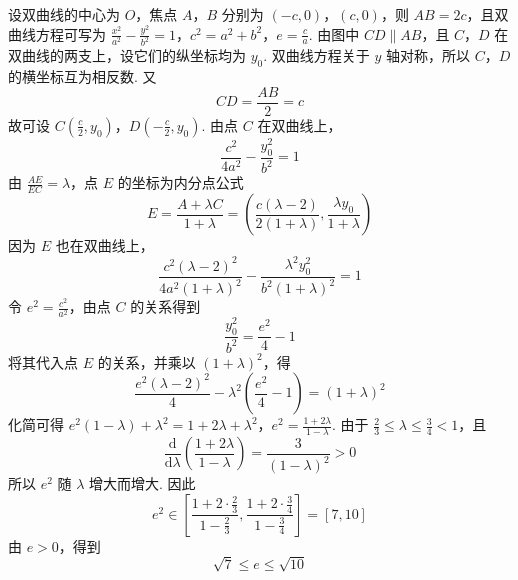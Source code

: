 \begin{solution}
设双曲线的中心为 \(O\)，焦点 \(A\)，\(B\) 分别为 \((-c,0)\)，\((c,0)\)，则 \(AB=2c\)，且双曲线方程可写为
\(\frac{x^2}{a^2}-\frac{y^2}{b^2}=1\)，\(c^2=a^2+b^2\)，\(e=\frac{c}{a}\).
由图中 \(CD\parallel AB\)，且 \(C\)，\(D\) 在双曲线的两支上，设它们的纵坐标均为 \(y_0\). 双曲线方程关于 \(y\) 轴对称，所以 \(C\)，\(D\) 的横坐标互为相反数. 又
\[
CD=\frac{AB}{2}=c
\]
故可设
\(C\left(\frac{c}{2},y_0\right)\)，\(D\left(-\frac{c}{2},y_0\right)\).
由点 \(C\) 在双曲线上，
\[
\frac{c^2}{4a^2}-\frac{y_0^2}{b^2}=1
\]
由 \(\frac{AE}{EC}=\lambda\)，点 \(E\) 的坐标为内分点公式
\[
E=\frac{A+\lambda C}{1+\lambda}
=\left(\frac{c(\lambda-2)}{2(1+\lambda)},\frac{\lambda y_0}{1+\lambda}\right)
\]
因为 \(E\) 也在双曲线上，
\[
\frac{c^2(\lambda-2)^2}{4a^2(1+\lambda)^2}
-\frac{\lambda^2y_0^2}{b^2(1+\lambda)^2}=1
\]
令 \(e^2=\frac{c^2}{a^2}\)，由点 \(C\) 的关系得到
\[
\frac{y_0^2}{b^2}=\frac{e^2}{4}-1
\]
将其代入点 \(E\) 的关系，并乘以 \((1+\lambda)^2\)，得
\[
\frac{e^2(\lambda-2)^2}{4}-\lambda^2\left(\frac{e^2}{4}-1\right)=(1+\lambda)^2
\]
化简可得
\(e^2(1-\lambda)+\lambda^2=1+2\lambda+\lambda^2\)，\(e^2=\frac{1+2\lambda}{1-\lambda}\).
由于 \(\frac23\leqslant\lambda\leqslant\frac34<1\)，且
\[
\frac{\mathrm d}{\mathrm d\lambda}\left(\frac{1+2\lambda}{1-\lambda}\right)=\frac{3}{(1-\lambda)^2}>0
\]
所以 \(e^2\) 随 \(\lambda\) 增大而增大. 因此
\[
e^2\in\left[\frac{1+2\cdot\frac23}{1-\frac23},\frac{1+2\cdot\frac34}{1-\frac34}\right]=[7,10]
\]
由 \(e>0\)，得到
\[
\sqrt{7}\leqslant e\leqslant\sqrt{10}
\]
\end{solution}
